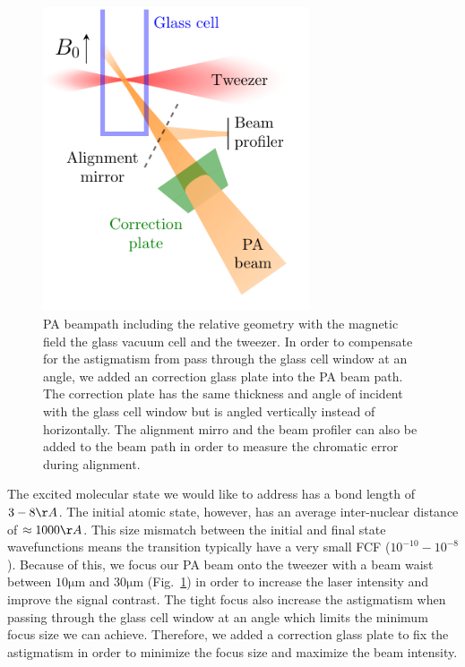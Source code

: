\begin{figure}
  \centering
  \includegraphics[width=0.7\textwidth]{figures/pa_beampath.pdf}
  \caption[PA beampath]{
    PA beampath including the relative geometry with the magnetic field
    the glass vacuum cell and the tweezer.
    In order to compensate for the astigmatism from pass through the glass cell window
    at an angle, we added an correction glass plate into the PA beam path.
    The correction plate has the same thickness and angle of incident with the glass cell window
    but is angled vertically instead of horizontally.
    The alignment mirro and the beam profiler can also be added to the beam path
    in order to measure the chromatic error during alignment.
    \label{fig:pa-beampath}}
\end{figure}

The excited molecular state we would like to address has a bond length of $3-8\AA$.
The initial atomic state, however, has an average inter-nuclear distance of $\approx1000\AA$.
This size mismatch between the initial and final state wavefunctions
means the transition typically have a very small FCF ($10^{-10}-10^{-8}$).
Because of this, we focus our PA beam onto the tweezer with a beam waist between
$10\mathrm{\mu m}$ and $30\mathrm{\mu m}$ (Fig.~\ref{fig:pa-beampath}) in order to
increase the laser intensity and improve the signal contrast.
The tight focus also increase the astigmatism when passing through
the glass cell window at an angle which limits the minimum focus size we can achieve.
Therefore, we added a correction glass plate to fix the astigmatism
in order to minimize the focus size and maximize the beam intensity.

